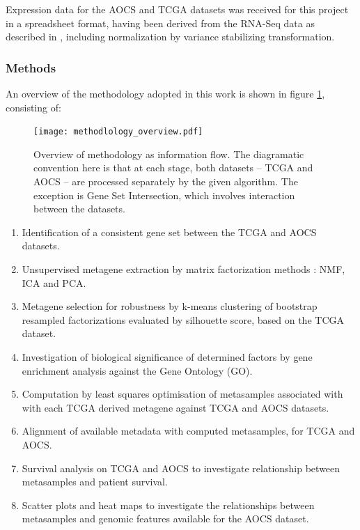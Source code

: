 \documentclass[draft,tikz, 12pt,a4paper,oneside,fleqn]{article}
\begin{document}
Expression data for the AOCS and TCGA datasets was received for this project in a spreadsheet format, having been derived from the RNA-Seq data as described in \cite{Ewing2020}, including  normalization by variance stabilizing transformation.   


\subsubsection{Methods}
An overview of the methodology adopted in this work is shown in figure \ref{fig-method-overview}, consisting of:

\begin{figure}[htb!]
\begin{center}
\texttt{[image: methodlology\_overview.pdf]}
\end{center}
\caption{Overview of methodology as information flow.  The diagramatic convention here is that at each stage, both datasets -- TCGA and AOCS -- are processed separately by the given algorithm.  The exception is Gene Set Intersection, which involves interaction between the datasets.}
\label{fig-method-overview}
\end{figure}

\begin{enumerate}
\item
Identification of a consistent gene set between the TCGA and AOCS datasets.
\item
Unsupervised metagene extraction by matrix factorization methods : NMF, ICA and PCA.
\item
Metagene selection for robustness by k-means clustering of bootstrap resampled factorizations evaluated by silhouette score, based on the TCGA dataset.
\item
Investigation of biological significance of determined factors by gene enrichment analysis against the Gene Ontology (GO).
\item
Computation by least squares optimisation of metasamples associated with with each TCGA derived metagene against TCGA and AOCS datasets.
\item
Alignment of available metadata with computed metasamples, for TCGA and AOCS.
\item 
Survival analysis on TCGA and AOCS to investigate relationship between metasamples and patient survival.
\item
Scatter plots and heat maps to investigate the relationships between metasamples and genomic features available for the AOCS dataset.

\end{enumerate}
\end{document}
